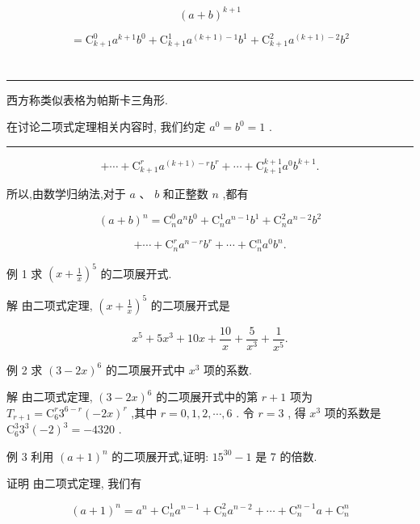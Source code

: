 \documentclass[10pt]{article}
\newcommand{\HRule}{\begin{center}\rule{0.9\linewidth}{0.2mm}\end{center}}
\begin{document}
\[
{\left( a + b\right) }^{k + 1}
\]

\[
= {\mathrm{C}}_{k + 1}^{0}{a}^{k + 1}{b}^{0} + {\mathrm{C}}_{k + 1}^{1}{a}^{\left( {k + 1}\right)  - 1}{b}^{1} + {\mathrm{C}}_{k + 1}^{2}{a}^{\left( {k + 1}\right)  - 2}{b}^{2}
\]

\section*{}

\HRule

西方称类似表格为帕斯卡三角形.

在讨论二项式定理相关内容时, 我们约定 \({a}^{0} = {b}^{0} = 1\) .

\HRule



\[
+ \cdots  + {\mathrm{C}}_{k + 1}^{r}{a}^{\left( {k + 1}\right)  - r}{b}^{r} + \cdots  + {\mathrm{C}}_{k + 1}^{k + 1}{a}^{0}{b}^{k + 1}.
\]

所以,由数学归纳法,对于 \(a\text{ 、 }b\) 和正整数 \(n\) ,都有

\[
{\left( a + b\right) }^{n} = {\mathrm{C}}_{n}^{0}{a}^{n}{b}^{0} + {\mathrm{C}}_{n}^{1}{a}^{n - 1}{b}^{1} + {\mathrm{C}}_{n}^{2}{a}^{n - 2}{b}^{2}
\]

\[
+ \cdots  + {\mathrm{C}}_{n}^{r}{a}^{n - r}{b}^{r} + \cdots  + {\mathrm{C}}_{n}^{n}{a}^{0}{b}^{n}.
\]

例 1 求 \({\left( x + \frac{1}{x}\right) }^{5}\) 的二项展开式.

解 由二项式定理, \({\left( x + \frac{1}{x}\right) }^{5}\) 的二项展开式是

\[
{x}^{5} + 5{x}^{3} + {10x} + \frac{10}{x} + \frac{5}{{x}^{3}} + \frac{1}{{x}^{5}}.
\]

例 2 求 \({\left( 3 - 2x\right) }^{6}\) 的二项展开式中 \({x}^{3}\) 项的系数.

解 由二项式定理, \({\left( 3 - 2x\right) }^{6}\) 的二项展开式中的第 \(r + 1\) 项为 \({T}_{r + 1} = {\mathrm{C}}_{6}^{r}{3}^{6 - r}{\left( -2x\right) }^{r}\) ,其中 \(r = 0,1,2,\cdots ,6\) . 令 \(r = 3\) , 得 \({x}^{3}\) 项的系数是 \({\mathrm{C}}_{6}^{3}{3}^{3}{\left( -2\right) }^{3} =  - {4320}\) .

例 3 利用 \({\left( a + 1\right) }^{n}\) 的二项展开式,证明: \({15}^{30} - 1\) 是 7 的倍数.

证明 由二项式定理, 我们有

\[
{\left( a + 1\right) }^{n} = {a}^{n} + {\mathrm{C}}_{n}^{1}{a}^{n - 1} + {\mathrm{C}}_{n}^{2}{a}^{n - 2} + \cdots  + {\mathrm{C}}_{n}^{n - 1}a + {\mathrm{C}}_{n}^{n}
\]
\end{document}
